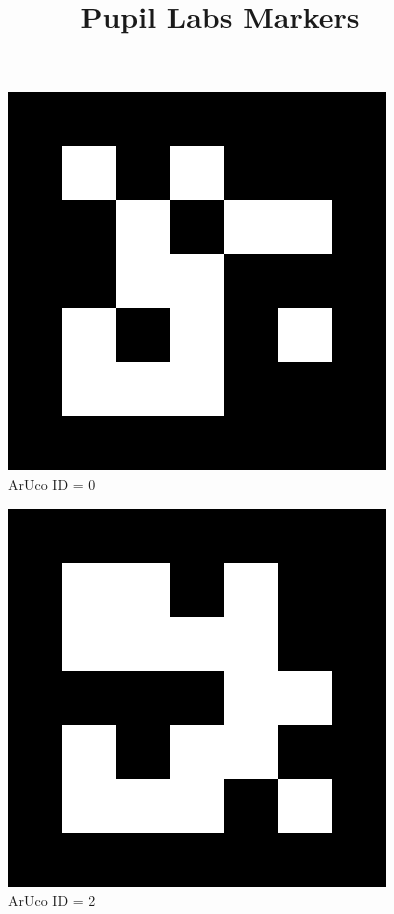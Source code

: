 \documentclass[1pt]{article}
\title{Pupil Labs Markers}
\date{}
\begin{document}
\maketitle

\begin{figure}[ht]
    \centering
    \includegraphics{ArUco/5x5_1000-0.png}
    \caption{ArUco ID = 0}
\end{figure}
\clearpage
\begin{figure}[ht]
    \centering
    \includegraphics{ArUco/5x5_1000-2.png}
    \caption{ArUco ID = 2}
\end{figure}
\clearpage
\end{document}
